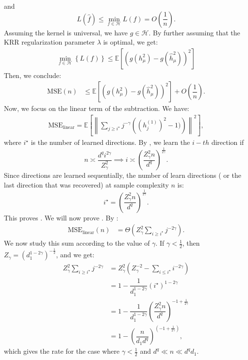 \documentclass[]{article}
\numberwithin{equation}{section}
\theoremstyle{definition}
\newcommand{\EE}{\mathbb{E}}
\begin{document}
and 
\begin{equation}
    L(\hat{f}) \leq \min_{f \in \mathcal{H}}L(f) = O(\dfrac{1}{n}).
\end{equation}
Assuming the kernel is universal, we have $g \in \mathcal{H}$. By further assuming that the  KRR regularization parameter $\lambda$ is optimal, we get: 
\begin{align}
    \min_{f \in \mathcal{H}} \left \{ L(f) \right \}  \leq  \EE\left [ (g(h^{2}_\mu) - g(\hat{h}^{2}_\mu) )^{2}\right ] 
\end{align}
Then, we conclude: 
\begin{align}
\textrm{MSE}(n) & \leq \EE \left [ \left ( g(h^{2}_\mu) - g(\hat{h}^{2}_\mu)\right )^{2}\right ] + O \left ( \dfrac{1}{n}\right ). 
\label{eq:non_linear_MSE}
\end{align}
Now, we focus on the linear term of the subtraction. We have: 
\begin{align}
    \mathrm{MSE}_\mathrm{linear} = \EE \left [ \left \| \sum_{j\geq i^{\star}} j^{-\gamma} \left ( (h_j^{(1)})^2 -1) \right )\right \|^2\right ],
    \label{eq:MSE_1}
\end{align}
where $i^\star$ is the number of learned directions. By , we learn the $i-th$ direction if 
\begin{equation}
    n \asymp \dfrac{d^{q}i^{2\gamma}}{Z_{\gamma}^{2}} \implies i \asymp \left (\dfrac{Z_{\gamma}^{2} n}{d^{q}}\right )^{\frac{1}{2\gamma}}.
\end{equation}
Since directions are learned sequentially, the number of learn directions ( or the last direction that was recovered) at sample complexity $n$ is: 
\begin{equation}
    i^{\star} =  \left (\dfrac{Z_{\gamma}^{2} n}{d^{q}}\right )^{\frac{1}{2\gamma}}. 
    \label{eq:expression_i_star}
\end{equation}
This proves . We will now prove . By : 
\begin{align}
    \mathrm{MSE}_\mathrm{linear}(n) & = \Theta \left ( Z_{\gamma}^{2}\sum_{i \geq i^\star} j^{-2\gamma} \right ).
\end{align}
We now study this sum according to the value of $\gamma$. If $\gamma < \frac{1}{2}$, then $Z_{\gamma} = (d_1^{1-2\gamma})^{-\frac{1}{2}}$, and we get: 
\begin{align}
   Z_{\gamma}^{2}\sum_{i \geq i^\star} j^{-2\gamma} & = Z_{\gamma}^{2} ( Z_{\gamma}^{-2} - \sum_{i \leq i^\star} i^{-2\gamma}) \\
   & = 1 - \dfrac{1}{d_1^{1-2\gamma}} (i^\star )^{1-2\gamma} \\ 
   & = 1 - \dfrac{1}{d_1^{1-2\gamma}} \left (\dfrac{Z_\gamma^2 n}{d^{q}}\right )^{-1+\frac{ 1}{2\gamma}} \\
   & = 1 - \left (\dfrac{n}{d_1 d^{q}}\right )^{( -1 + \frac{1}{2\gamma})},
\end{align}
which gives the rate for the case where $\gamma < \frac{1}{2} $ and $d^{q} \ll n \ll d^{q}d_1$.
\end{document}
